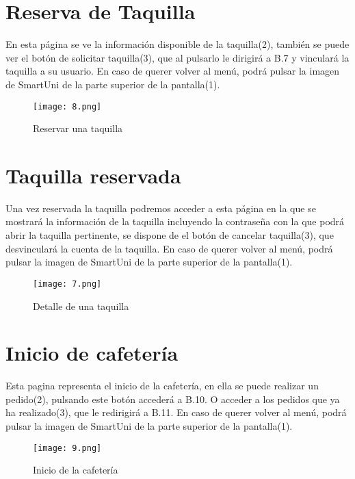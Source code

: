 \documentclass[12pt]{report}
\begin{document}
\begin{appendices}
\section{Reserva de Taquilla}

En esta página se ve la información disponible de la taquilla(2), también se puede ver el botón de solicitar taquilla(3), que al pulsarlo le dirigirá a B.7 y vinculará la taquilla a su usuario. En caso de querer volver al menú, podrá pulsar la imagen de SmartUni de la parte superior de la pantalla(1).
\begin{figure}[H]
    \centering
    \texttt{[image: 8.png]}
    \caption{Reservar una taquilla}
    \label{fig:Figura3.4.3}
\end{figure}

\section{Taquilla reservada}
Una vez reservada la taquilla podremos acceder a esta página en la que se mostrará la información de la taquilla incluyendo la contraseña con la que podrá abrir la taquilla pertinente, se dispone de el botón de cancelar taquilla(3), que desvinculará la cuenta de la taquilla. En caso de querer volver al menú, podrá pulsar la imagen de SmartUni de la parte superior de la pantalla(1).
\begin{figure}[H]
    \centering
    \texttt{[image: 7.png]}
    \caption{Detalle de una taquilla}
    \label{fig:enter-label}
\end{figure}

\section{Inicio de cafetería}
Esta pagina representa el inicio de la cafetería, en ella se puede realizar un pedido(2), pulsando este botón accederá a B.10. O acceder a los pedidos que ya ha realizado(3), que le redirigirá a B.11. En caso de querer volver al menú, podrá pulsar la imagen de SmartUni de la parte superior de la pantalla(1).
\begin{figure}[H]
    \centering
    \texttt{[image: 9.png]}
    \caption{Inicio de la cafetería}
    \label{fig:enter-label}
\end{figure}


\end{appendices}
\end{document}
